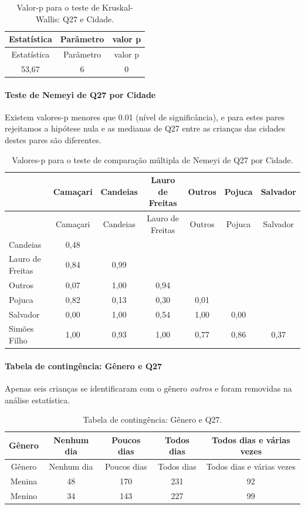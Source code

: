 \documentclass[]{article}
\let\oldparagraph\paragraph
\renewcommand{\paragraph}[1]{\oldparagraph{#1}\mbox{}}
\begin{document}
\begin{longtable}[]{@{}ccc@{}}
\caption{\label{tab:unnamed-chunk-786}Valor-p para o teste de Kruskal-Wallis: Q27 e Cidade.}\tabularnewline
\toprule
Estatística & Parâmetro & valor p\tabularnewline
\midrule
\endfirsthead
\toprule
Estatística & Parâmetro & valor p\tabularnewline
\midrule
\endhead
53,67 & 6 & 0\tabularnewline
\bottomrule
\end{longtable}

\hypertarget{teste-de-nemeyi-de-q27-por-cidade}{%
\paragraph{Teste de Nemeyi de Q27 por Cidade}\label{teste-de-nemeyi-de-q27-por-cidade}}

Existem valores-p menores que 0.01 (nível de significância), e para estes pares rejeitamos a hipótese nula e as medianas de Q27 entre as crianças das cidades destes pares são diferentes.

\begin{longtable}[]{@{}lcccccc@{}}
\caption{\label{tab:unnamed-chunk-788}Valores-p para o teste de comparação múltipla de Nemeyi de Q27 por Cidade.}\tabularnewline
\toprule
& Camaçari & Candeias & Lauro de Freitas & Outros & Pojuca & Salvador\tabularnewline
\midrule
\endfirsthead
\toprule
& Camaçari & Candeias & Lauro de Freitas & Outros & Pojuca & Salvador\tabularnewline
\midrule
\endhead
Candeias & 0,48 & & & & &\tabularnewline
Lauro de Freitas & 0,84 & 0,99 & & & &\tabularnewline
Outros & 0,07 & 1,00 & 0,94 & & &\tabularnewline
Pojuca & 0,82 & 0,13 & 0,30 & 0,01 & &\tabularnewline
Salvador & 0,00 & 1,00 & 0,54 & 1,00 & 0,00 &\tabularnewline
Simões Filho & 1,00 & 0,93 & 1,00 & 0,77 & 0,86 & 0,37\tabularnewline
\bottomrule
\end{longtable}

\cleardoublepage

\hypertarget{tabela-de-continguxeancia-guxeanero-e-q27}{%
\paragraph{Tabela de contingência: Gênero e Q27}\label{tabela-de-continguxeancia-guxeanero-e-q27}}

Apenas seis crianças se identificaram com o gênero \emph{outros} e foram removidas na análise estatística.

\begin{longtable}[]{@{}ccccc@{}}
\caption{\label{tab:unnamed-chunk-789}Tabela de contingência: Gênero e Q27.}\tabularnewline
\toprule
Gênero & Nenhum dia & Poucos dias & Todos dias & Todos dias e várias vezes\tabularnewline
\midrule
\endfirsthead
\toprule
Gênero & Nenhum dia & Poucos dias & Todos dias & Todos dias e várias vezes\tabularnewline
\midrule
\endhead
Menina & 48 & 170 & 231 & 92\tabularnewline
Menino & 34 & 143 & 227 & 99\tabularnewline
\bottomrule
\end{longtable}
\end{document}
